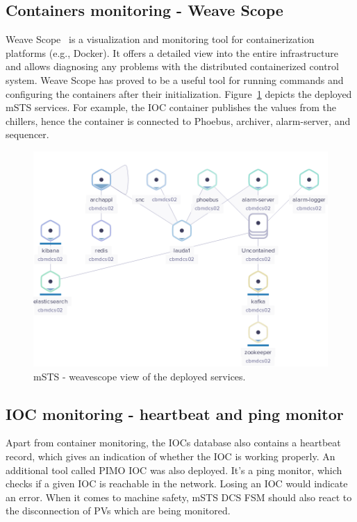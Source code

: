 \subsection{Containers monitoring - Weave Scope}

Weave Scope~\cite{weavescope} is a visualization and monitoring tool for containerization platforms (e.g., Docker). It offers a detailed view into the entire infrastructure and allows diagnosing any problems with the distributed containerized control system. Weave Scope has proved to be a useful tool for running commands and configuring the containers after their initialization. Figure~\ref{fig_weave} depicts the deployed \gls{mSTS} services. For example, the \gls{IOC} container publishes the values from the chillers, hence the container is connected to Phoebus, archiver, alarm-server, and sequencer.
\begin{figure}[!h]
\centering
\includegraphics[width=0.85\columnwidth]{Chapter6/DCS/images/weave.png}
\caption{mSTS - weavescope view of the deployed services.}
\label{fig_weave}
\end{figure}
\subsection{IOC monitoring - heartbeat and ping monitor}
Apart from container monitoring, the \glspl{IOC} database also contains a heartbeat record, which gives an indication of whether the \gls{IOC} is working properly. An additional tool called PIMO \gls{IOC} was also deployed. It's a ping monitor, which checks if a given \gls{IOC} is reachable in the network. Losing an \gls{IOC} would indicate an error. When it comes to machine safety, \gls{mSTS} \gls{DCS} \gls{FSM} should also react to the disconnection of \glspl{PV} which are being monitored.
